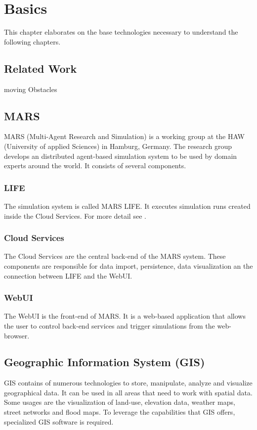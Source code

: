 
\chapter{Basics}
This chapter elaborates on the base technologies necessary to understand the following chapters.



\section{Related Work}
\cite{Wang2016} moving Obstacles



\section{MARS}
MARS (Multi-Agent Research and Simulation) is a working group at the HAW (University of applied Sciences) in Hamburg, Germany. The research group develops an distributed agent-based simulation system to be used by domain experts around the world. It consists of several components.


\subsection{LIFE}
The simulation system is called MARS LIFE. It executes simulation runs created inside the Cloud Services. For more detail see \cite{Huning2016}.


\subsection{Cloud Services}
The Cloud Services are the central back-end of the MARS system. These components are responsible for data import, persistence, data visualization an the connection between LIFE and the WebUI.


\subsection{WebUI}
The WebUI is the front-end of MARS. It is a web-based application that allows the user to control back-end services and trigger simulations from the web-browser.



\section{Geographic Information System (GIS)}
GIS contains of numerous technologies to store, manipulate, analyze and visualize geographical data. It can be used in all areas that need to work with spatial data. Some usages are the visualization of land-use, elevation data, weather maps, street networks and flood maps. To leverage the capabilities that GIS offers, specialized GIS software is required.


